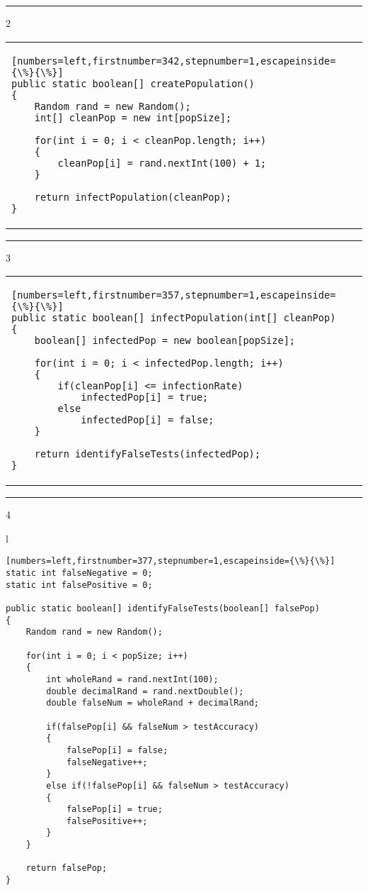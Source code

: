 \documentclass[letterpaper, 10pt,DIV=13]{scrartcl}
\numberwithin{equation}{section} %
\numberwithin{figure}{section} %
\numberwithin{table}{section} %
\begin{document}
\par\noindent\rule{\textwidth}{0.4pt}

2
\begin{center}
\begin{tabular}{l}
\begin{lstlisting}[numbers=left,firstnumber=342,stepnumber=1,escapeinside={\%}{\%}]
public static boolean[] createPopulation()
{
    Random rand = new Random();
    int[] cleanPop = new int[popSize];

    for(int i = 0; i < cleanPop.length; i++)
    {
        cleanPop[i] = rand.nextInt(100) + 1;
    }

    return infectPopulation(cleanPop);
}
\end{lstlisting}
\end{tabular}
\end{center}\textbf{}

\par\noindent\rule{\textwidth}{0.4pt}

3
\begin{center}
\begin{tabular}{l}
\begin{lstlisting}[numbers=left,firstnumber=357,stepnumber=1,escapeinside={\%}{\%}]
public static boolean[] infectPopulation(int[] cleanPop)
{
    boolean[] infectedPop = new boolean[popSize];

    for(int i = 0; i < infectedPop.length; i++)
    {
        if(cleanPop[i] <= infectionRate)
            infectedPop[i] = true;
        else
            infectedPop[i] = false;
    }

    return identifyFalseTests(infectedPop);
}
\end{lstlisting}
\end{tabular}
\end{center}\textbf{}

\par\noindent\rule{\textwidth}{0.4pt}

4
\begin{center}
\begin{tabular}{l}
\begin{lstlisting}[numbers=left,firstnumber=377,stepnumber=1,escapeinside={\%}{\%}]
static int falseNegative = 0;
static int falsePositive = 0;

public static boolean[] identifyFalseTests(boolean[] falsePop)
{
    Random rand = new Random();

    for(int i = 0; i < popSize; i++)
    {
        int wholeRand = rand.nextInt(100);
        double decimalRand = rand.nextDouble();
        double falseNum = wholeRand + decimalRand;

        if(falsePop[i] && falseNum > testAccuracy)
        {
            falsePop[i] = false;
            falseNegative++;
        }
        else if(!falsePop[i] && falseNum > testAccuracy)
        {
            falsePop[i] = true;
            falsePositive++;
        }
    }

    return falsePop;
}
\end{lstlisting}
\end{tabular}
\end{center}\textbf{}
\end{document}
